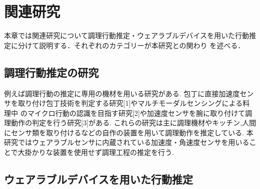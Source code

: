 \section{関連研究}
本章では関連研究について調理行動推定・ウェアラブルデバイスを用いた行動推定に分けて説明する．それぞれのカテゴリーが本研究との関わり
を述べる．
\subsection{調理行動推定の研究}
例えば調理行動の推定に専用の機材を用いる研究がある.
包丁に直接加速度センサを取り付け包丁技術を判定する研究[1]やマルチモーダルセンシングによる料理中
のマイクロ行動の認識を目指す研究[2]や加速度センサを腕に取り付けて調理動作の判定を行う研究[3]がある.
これらの研究は主に調理機材やキッチン,人間にセンサ類を取り付けるなどの自作の装置を用いて調理動作を推定している.
本研究ではウェアラブルセンサに内蔵されている加速度・角速度センサを用いることで大掛かりな装置を使用せず調理工程の推定を行う.
\subsection{ウェアラブルデバイスを用いた行動推定}

